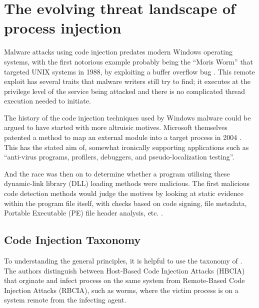 




\pagebreak
\section{The evolving threat landscape of process injection}

Malware attacks using code injection predates modern Windows operating systems, with the first notorious example probably being the ``Moris Worm''
that targeted UNIX systems in 1988, by exploiting a buffer overflow bug \autocite{Spafford:1989}.  This remote exploit has several
traits that malware writers still try to find; it executes at the privilege level of the service being attacked and there is no complicated
thread execution needed to initiate.

The history of the code injection techniques used by Windows malware could be argued to have started with more altruisic motives.
Microsoft themselves patented a method to map an external module into a target process in 2004 \autocite{Ghizzoni:2004}.  This has the
stated aim of, somewhat ironically supporting applications such as ``anti-virus programs, profilers, debuggers, and pseudo-localization testing''.

And the race was then on to determine whether a program utilising these dynamic-link library (DLL) loading methods were malicious.
The first malicious code detection methods would judge the motives by looking at static evidence within the program file itself,
with checks based on code signing, file metadata, Portable Executable (PE) file header analysis, etc. \autocite{Jang:2007}.

\subsection{Code Injection Taxonomy}

To understanding the general principles, it is helpful to use the taxonomy of \textcite{Barabosch:2014}.
The authors distinguish between Host-Based Code Injection Attacks (HBCIA) that orginate and infect process on the
same system from Remote-Based Code Injection Attacks (RBCIA), such as worms, where the victim process is on a system
remote from the infecting agent.

